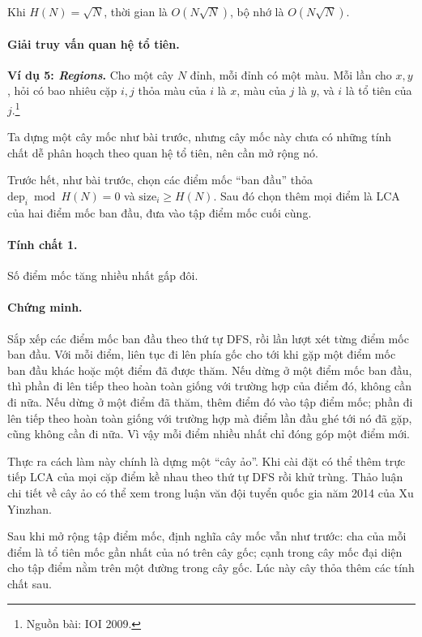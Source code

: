 \documentclass[11pt]{article}
\begin{document}
Khi \(H(N)=\sqrt N\), thời gian là \(O(N\sqrt N)\), bộ nhớ là
\(O(N\sqrt N)\).

\paragraph{Giải truy vấn quan hệ tổ tiên.}
\textbf{Ví dụ 5: \emph{Regions}.} Cho một cây \(N\) đỉnh, mỗi đỉnh có một màu.
Mỗi lần cho \(x,y\), hỏi có bao nhiêu cặp \(i,j\) thỏa màu của \(i\) là \(x\),
màu của \(j\) là \(y\), và \(i\) là tổ tiên của \(j\).\footnote{Nguồn bài:
IOI 2009.}

Ta dựng một cây mốc như bài trước, nhưng cây mốc này chưa có những tính chất dễ
phân hoạch theo quan hệ tổ tiên, nên cần mở rộng nó.

Trước hết, như bài trước, chọn các điểm mốc ``ban đầu'' thỏa
\(\mathrm{dep}_i\bmod H(N)=0\) và \(\mathrm{size}_i\ge H(N)\). Sau đó chọn thêm
mọi điểm là LCA của hai điểm mốc ban đầu, đưa vào tập điểm mốc cuối cùng.

\paragraph{Tính chất 1.}
Số điểm mốc tăng nhiều nhất gấp đôi.

\paragraph{Chứng minh.}
Sắp xếp các điểm mốc ban đầu theo thứ tự DFS, rồi lần lượt xét từng điểm mốc
ban đầu. Với mỗi điểm, liên tục đi lên phía gốc cho tới khi gặp một điểm mốc
ban đầu khác hoặc một điểm đã được thăm. Nếu dừng ở một điểm mốc ban đầu, thì
phần đi lên tiếp theo hoàn toàn giống với trường hợp của điểm đó, không cần đi
nữa. Nếu dừng ở một điểm đã thăm, thêm điểm đó vào tập điểm mốc; phần đi lên
tiếp theo hoàn toàn giống với trường hợp mà điểm lần đầu ghé tới nó đã gặp,
cũng không cần đi nữa. Vì vậy mỗi điểm nhiều nhất chỉ đóng góp một điểm mới.

Thực ra cách làm này chính là dựng một ``cây ảo''. Khi cài đặt có thể thêm trực
tiếp LCA của mọi cặp điểm kề nhau theo thứ tự DFS rồi khử trùng. Thảo luận chi
tiết về cây ảo có thể xem trong luận văn đội tuyển quốc gia năm 2014 của Xu
Yinzhan.

Sau khi mở rộng tập điểm mốc, định nghĩa cây mốc vẫn như trước: cha của mỗi
điểm là tổ tiên mốc gần nhất của nó trên cây gốc; cạnh trong cây mốc đại diện
cho tập điểm nằm trên một đường trong cây gốc. Lúc này cây thỏa thêm các tính
chất sau.
\end{document}
